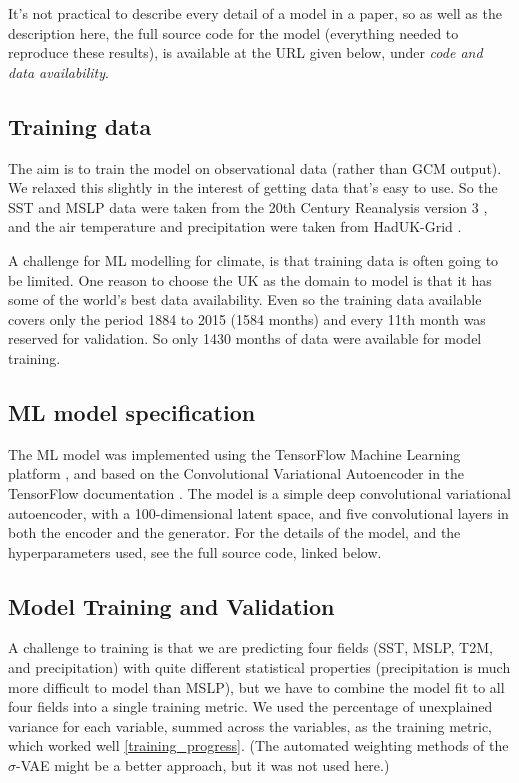 \documentclass[gmd]{copernicus}
\begin{document}
It's not practical to describe every detail of a model in a paper, so as well as the description here, the full source code for the model (everything needed to reproduce these results), is available at the URL given below, under {\it code and data availability}.

\subsection{Training data}

The aim is to train the model on observational data (rather than GCM output). We relaxed this slightly in the interest of getting data that's easy to use. So the SST and MSLP data were taken from the 20th Century Reanalysis version 3 \citep{slivinski_20crv3.1}, and the air temperature and precipitation
were taken from HadUK-Grid \citep{HadUK-Grid}.

A challenge for ML modelling for climate, is that training data is often going to be limited. One reason to choose the UK as the domain to model is that it has some of the world's best data availability. Even so the training data available covers only the period 1884 to 2015 (1584 months) and every 11th month was reserved for validation. So only 1430 months of data were available for model training.

\subsection{ML model specification}

The ML model was implemented using the TensorFlow Machine Learning platform \citep{tensorflow2015-whitepaper}, and based on the Convolutional Variational Autoencoder in the TensorFlow documentation \citep{TF_CVAE}. The model is a simple deep convolutional variational autoencoder, with a 100-dimensional latent space, and five convolutional layers in both the encoder and the generator. For the details of the model, and the hyperparameters used, see the full source code, linked below.

\subsection{Model Training and Validation}

A challenge to training is that we are predicting four fields (SST, MSLP, T2M, and precipitation) with quite different statistical properties (precipitation is much more difficult to model than MSLP), but we have to combine the model fit to all four fields into a single training metric. We used the percentage of unexplained variance for each variable, summed across the variables, as the training metric, which worked well \ref{training_progress}. (The automated weighting methods of the $\sigma$-VAE \citep{sigma-VAE} might be a better approach, but it was not used here.)
\end{document}
